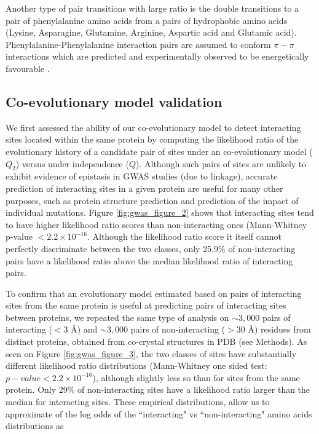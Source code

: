 Another type of pair transitions with large ratio is the double transitions to a pair of phenylalanine amino acids from a pairs of hydrophobic amino acids (Lysine, Asparagine, Glutamine, Arginine, Aspartic acid and Glutamic acid). Phenylalanine-Phenylalanine interaction pairs are assumed to conform $\pi-\pi$ interactions which are predicted and experimentally observed to be energetically favourable \cite{hunter1991pi}.

\subsection{Co-evolutionary model validation}

We first assessed the ability of our co-evolutionary model to detect interacting sites located within the same protein by computing the likelihood ratio of the evolutionary history of a candidate pair of sites under an co-evolutionary model ($Q_2$) versus under independence ($Q$). Although such pairs of sites are unlikely to exhibit evidence of epistasis in GWAS studies (due to linkage), accurate prediction of interacting sites in a given protein are useful for many other purposes, such as protein structure prediction and prediction of the impact of individual mutations.  Figure \ref{fig:gwas_figure_2} shows that interacting sites tend to have higher likelihood ratio scores than non-interacting ones (Mann-Whitney p-value $< 2.2 \times 10^{-16}$. Although the likelihood ratio score it itself cannot perfectly discriminate between the two classes, only 25.9\% of non-interacting pairs have a likelihood ratio above the median likelihood ratio of interacting pairs. 


To confirm that an evolutionary model estimated based on pairs of interacting sites from the same protein is useful at predicting pairs of interacting sites between proteins, we repeated the same type of analysis on $\sim 3,000$ pairs of interacting ($< 3$ \r{A}) and $\sim 3,000$ pairs of non-interacting ($>30$ \r{A}) residues from distinct proteins, obtained from co-crystal structures in PDB (see Methods). As seen on Figure \ref{fig:gwas_figure_3}, the two classes of sites have substantially different likelihood ratio distributions (Mann-Whitney one sided test: $p-value < 2.2 \times 10^{-16}$), although slightly less so than for sites from the same protein. Only 29\% of non-interacting sites have a likelihood ratio larger than the median for interacting sites. These empirical distributions, allow us to approximate of the log odds of the ``interacting" vs ``non-interacting" amino acids distributions as

